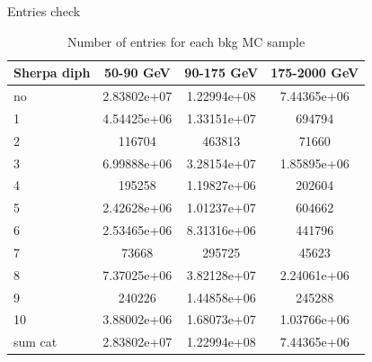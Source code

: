 \documentclass[10pt,UKenglish, leqno, xcolor = dvipsnames]{beamer}
\begin{document}
		\begin{frame}{Entries check}
			\vfill
			\centering
			\begin{table}[tbp]
				\centering
				\begin{tabular}{lccc}
					\toprule[1.5pt]
					Sherpa diph	& 50-90 GeV	& 90-175 GeV & 175-2000 GeV	\\
					\midrule
					no	& 2.83802e+07 	& 1.22994e+08	& 7.44365e+06	\\ 
					1 	& 4.54425e+06 	& 1.33151e+07 	& 694794		\\
					2	& 116704		& 463813		& 71660			\\
					3 	& 6.99888e+06 	& 3.28154e+07 	& 1.85895e+06	\\
					4 	& 195258 		& 1.19827e+06 	& 202604		\\	
					5 	& 2.42628e+06 	& 1.01237e+07 	& 604662		\\
					6 	& 2.53465e+06 	& 8.31316e+06 	& 441796		\\
					7 	& 73668 		& 295725 		& 45623			\\
					8 	& 7.37025e+06 	& 3.82128e+07 	& 2.24061e+06	\\
					9 	& 240226 		& 1.44858e+06 	& 245288		\\
					10 	& 3.88002e+06 	& 1.68073e+07 	& 1.03766e+06	\\
					sum cat & 2.83802e+07 & 1.22994e+08 & 7.44365e+06	\\
					
					\bottomrule[1.5pt]
				\end{tabular}
				\caption{Number of entries for each bkg MC sample}
			\end{table}
			\vfill
		\end{frame}
	
\end{document}
